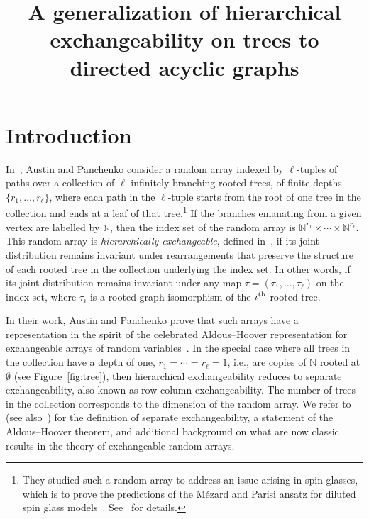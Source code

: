 \documentclass[AHL,Unicode,longabstracts,published]{cedram}
\title[Hierarchical exchangeability on DAGs]{A generalization of hierarchical exchangeability on trees to directed acyclic graphs}
\author{\firstname{Paul} \lastname{Jung}}
\author{\firstname{Jiho} \lastname{Lee}}
\author{\firstname{Sam} \lastname{Staton}}
\author{\firstname{Hongseok} \lastname{Yang}}
\newcommand*\N{\mathbb{N}}
\newcommand*\N{\mathbb{N}}
\begin{document}
\maketitle




\section{Introduction}

In~\cite{austin:panchenko:2014}, Austin and Panchenko consider a random array indexed by $\ell$-tuples of paths over a collection of $\ell$ infinitely-branching rooted trees, of finite depths $\{r_1,\ldots, r_\ell\}$, where each path in the $\ell$-tuple starts from the root of one tree in the collection and ends at a leaf of that tree.\footnote{They studied such a random array to address an issue arising in spin glasses, which is to prove the predictions of the Mézard and Parisi ansatz for diluted spin glass models~\cite{Mzard2001TheBL}. See~\cite{panchenko2015hierarchical} for details.} If the branches emanating from a given vertex are labelled by $\N$, then the index set of the random array is $\N^{r_1}\times\cdots\times\N^{r_\ell}$. This random array is \emph{hierarchically exchangeable}, defined in~\cite{austin:panchenko:2014}, if its joint distribution remains invariant under rearrangements that preserve the structure of each {rooted} tree in the collection underlying the index set. In other words, if its joint distribution remains invariant under any map $\tau=(\tau_1,\ldots,\tau_\ell)$ on the index set, where $\tau_i$ is a rooted-graph isomorphism of the $i^{\rm th}$ rooted tree.


In their work, Austin and Panchenko prove that such arrays have a representation in the spirit of the celebrated Aldous--Hoover representation for exchangeable arrays of random variables~\cite{aldous1981representations, aldous1985exchangeability,hoover1979relations}. In the special case where all trees in the collection have a depth of one, $r_1=\cdots=r_\ell=1$, i.e., are copies of $\N$ rooted at $\emptyset$ (see Figure~\ref{fig:tree}), then hierarchical exchangeability reduces to separate exchangeability, also known as row-column exchangeability. The number of trees in the collection corresponds to the dimension of the random array. We refer to~\cite[Chapter~7]{kallenberg2006probabilistic} (see also~\cite{aldous1985exchangeability, austin2012exchangeable}) for the definition of separate exchangeability, a statement of the Aldous--Hoover theorem, and additional background on what are now classic results in the theory of exchangeable random arrays.
\end{document}
